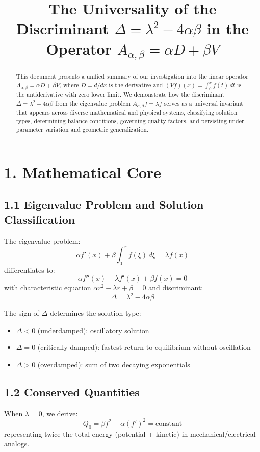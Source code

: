 \documentclass[11pt]{article}
\title{The Universality of the Discriminant $\Delta = \lambda^2 - 4\alpha\beta$ in the Operator $A_{\alpha,\beta} = \alpha D + \beta V$}
\author{}
\date{}
\begin{document}
\maketitle
\begin{abstract}
This document presents a unified summary of our investigation into the linear operator $A_{\alpha,\beta} = \alpha D + \beta V$, where $D = d/dx$ is the derivative and $(V f)(x) = \int_0^x f(t)\,dt$ is the antiderivative with zero lower limit. We demonstrate how the discriminant $\Delta = \lambda^2 - 4\alpha\beta$ from the eigenvalue problem $A_{\alpha,\beta}f = \lambda f$ serves as a universal invariant that appears across diverse mathematical and physical systems, classifying solution types, determining balance conditions, governing quality factors, and persisting under parameter variation and geometric generalization.
\end{abstract}

\section{1. Mathematical Core}

\subsection{1.1 Eigenvalue Problem and Solution Classification}
The eigenvalue problem:
$$
\alpha f'(x) + \beta \int_0^x f(\xi)\,d\xi = \lambda f(x)
$$
differentiates to:
$$
\alpha f''(x) - \lambda f'(x) + \beta f(x) = 0
$$
with characteristic equation $\alpha r^2 - \lambda r + \beta = 0$ and discriminant:
$$
\Delta = \lambda^2 - 4\alpha\beta
$$

The sign of $\Delta$ determines the solution type:
\begin{itemize}
\item $\Delta < 0$ (underdamped): oscillatory solution
\item $\Delta = 0$ (critically damped): fastest return to equilibrium without oscillation
\item $\Delta > 0$ (overdamped): sum of two decaying exponentials
\end{itemize}

\subsection{1.2 Conserved Quantities}
When $\lambda = 0$, we derive:
$$
Q_0 = \beta f^2 + \alpha (f')^2 = \text{constant}
$$
representing twice the total energy (potential + kinetic) in mechanical/electrical analogs.
\end{document}
